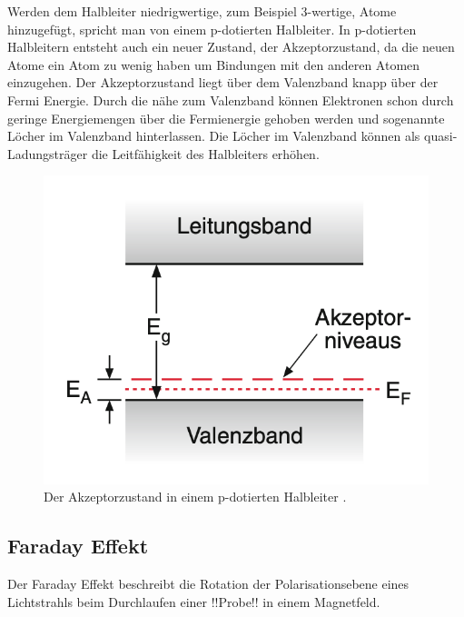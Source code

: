Werden dem Halbleiter niedrigwertige, zum Beispiel 3-wertige, Atome hinzugefügt, spricht man von einem p-dotierten Halbleiter. In p-dotierten Halbleitern entsteht auch ein neuer Zustand, der Akzeptorzustand, da die neuen Atome ein Atom zu wenig haben um Bindungen mit den anderen Atomen einzugehen.
Der Akzeptorzustand liegt über dem Valenzband knapp über der Fermi Energie.
Durch die nähe zum Valenzband können Elektronen schon durch geringe Energiemengen über die Fermienergie gehoben werden und sogenannte Löcher im Valenzband hinterlassen.
Die Löcher im Valenzband können als quasi-Ladungsträger die Leitfähigkeit des Halbleiters erhöhen.
\begin{figure}[ht]
    \centering
    \includegraphics[scale = 0.5]{./bilder/p_Donatorschema_demtroeder.png}
    \caption{Der Akzeptorzustand in einem p-dotierten Halbleiter \cite{demtröder}.}
    \label{fig:p_donator}
\end{figure}

\subsection{Faraday Effekt}
Der Faraday Effekt beschreibt die Rotation der Polarisationsebene eines Lichtstrahls beim Durchlaufen einer !!Probe!! in einem Magnetfeld.

